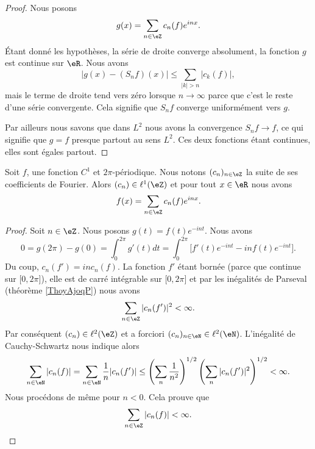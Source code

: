 \begin{proof}
    Nous posons 
    \begin{equation}
        g(x)=\sum_{n\in \eZ}c_n(f) e^{inx}.
    \end{equation}
    Étant donné les hypothèses, la série de droite converge absolument, la fonction \( g\) est continue sur \( \eR\). Nous avons
    \begin{equation}
        \big| g(x)-(S_nf)(x) \big|\leq \sum_{| k |> n}| c_k(f) |,
    \end{equation}
    mais le terme de droite tend vers zéro lorsque \( n\to \infty\) parce que c'est le reste d'une série convergente. Cela signifie que \( S_nf\) converge uniformément vers \( g\).

    Par ailleurs nous savons que dans \( L^2\) nous avons la convergence \( S_nf\to f\), ce qui signifie que \( g=f\) presque partout au sens \( L^2\). Ces deux fonctions étant continues, elles sont égales partout.
\end{proof}

\begin{theorem}     \label{ThozHXraQ}
    Soit \( f\), une fonction \( C^1\) et \( 2\pi\)-périodique. Nous notons \( (c_n)_{n\in \eZ}\) la suite de ses coefficients de Fourier. Alors \( (c_n)\in \ell^1(\eZ)\) et pour tout \( x\in \eR\) nous avons
    \begin{equation}
        f(x)=\sum_{n\in \eZ}c_n(f) e^{inx}.
    \end{equation}
\end{theorem}

\begin{proof}
    Soit \( n\in \eZ\). Nous posons \( g(t)=f(t) e^{-int}\). Nous avons
    \begin{equation}
        0=g(2\pi)-g(0)=\int_0^{2\pi}g'(t)dt=\int_0^{2\pi}\big[ f'(t) e^{-int}-inf(t) e^{-int} \big].
    \end{equation}
    Du coup, \( c_n(f')=inc_n(f)\). La fonction \( f'\) étant bornée (parce que continue sur \( \mathopen[ 0 , 2\pi \mathclose]\)), elle est de carré intégrable sur \( \mathopen[ 0 , 2\pi \mathclose]\) et par les inégalités de Parseval (théorème \ref{ThoyAjoqP}) nous avons
    \begin{equation}
        \sum_{n\in \eZ}| c_n(f') |^2<\infty.
    \end{equation}
    Par conséquent \( (c_n)\in \ell^2(\eZ)\) et a forciori \( (c_n)_{n\in \eN}\in \ell^2(\eN)\). L'inégalité de Cauchy-Schwartz nous indique alors
    \begin{equation}
        \sum_{n\in \eN}| c_n(f) |=\sum_{n\in \eN}\frac{1}{ n }| c_n(f') |\leq \left( \sum_n\frac{1}{ n^2 } \right)^{1/2}\left( \sum_{n}| c_n(f') |^2 \right)^{1/2}<\infty.
    \end{equation}
    Nous procédons de même pour \( n<0\). Cela prouve que 
    \begin{equation}
        \sum_{n\in \eZ}| c_n(f) |<\infty.
    \end{equation}
\end{proof}

